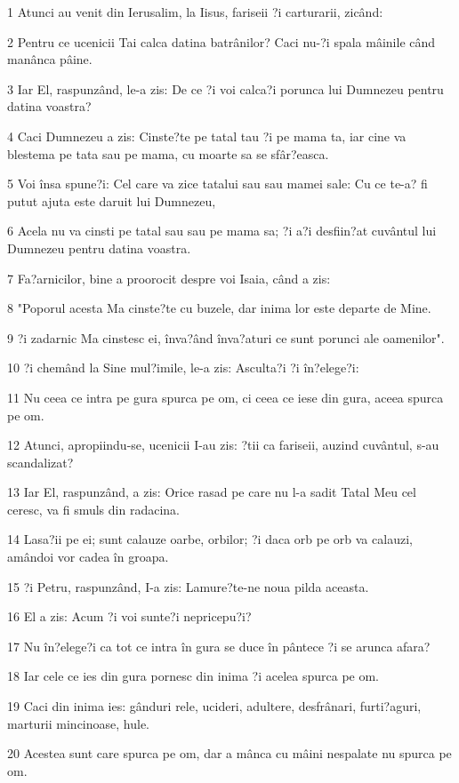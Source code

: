 \par 1 Atunci au venit din Ierusalim, la Iisus, fariseii ?i carturarii, zicând:
\par 2 Pentru ce ucenicii Tai calca datina batrânilor? Caci nu-?i spala mâinile când manânca pâine.
\par 3 Iar El, raspunzând, le-a zis: De ce ?i voi calca?i porunca lui Dumnezeu pentru datina voastra?
\par 4 Caci Dumnezeu a zis: Cinste?te pe tatal tau ?i pe mama ta, iar cine va blestema pe tata sau pe mama, cu moarte sa se sfâr?easca.
\par 5 Voi însa spune?i: Cel care va zice tatalui sau sau mamei sale: Cu ce te-a? fi putut ajuta este daruit lui Dumnezeu,
\par 6 Acela nu va cinsti pe tatal sau sau pe mama sa; ?i a?i desfiin?at cuvântul lui Dumnezeu pentru datina voastra.
\par 7 Fa?arnicilor, bine a proorocit despre voi Isaia, când a zis:
\par 8 "Poporul acesta Ma cinste?te cu buzele, dar inima lor este departe de Mine.
\par 9 ?i zadarnic Ma cinstesc ei, înva?ând înva?aturi ce sunt porunci ale oamenilor".
\par 10 ?i chemând la Sine mul?imile, le-a zis: Asculta?i ?i în?elege?i:
\par 11 Nu ceea ce intra pe gura spurca pe om, ci ceea ce iese din gura, aceea spurca pe om.
\par 12 Atunci, apropiindu-se, ucenicii I-au zis: ?tii ca fariseii, auzind cuvântul, s-au scandalizat?
\par 13 Iar El, raspunzând, a zis: Orice rasad pe care nu l-a sadit Tatal Meu cel ceresc, va fi smuls din radacina.
\par 14 Lasa?ii pe ei; sunt calauze oarbe, orbilor; ?i daca orb pe orb va calauzi, amândoi vor cadea în groapa.
\par 15 ?i Petru, raspunzând, I-a zis: Lamure?te-ne noua pilda aceasta.
\par 16 El a zis: Acum ?i voi sunte?i nepricepu?i?
\par 17 Nu în?elege?i ca tot ce intra în gura se duce în pântece ?i se arunca afara?
\par 18 Iar cele ce ies din gura pornesc din inima ?i acelea spurca pe om.
\par 19 Caci din inima ies: gânduri rele, ucideri, adultere, desfrânari, furti?aguri, marturii mincinoase, hule.
\par 20 Acestea sunt care spurca pe om, dar a mânca cu mâini nespalate nu spurca pe om.
